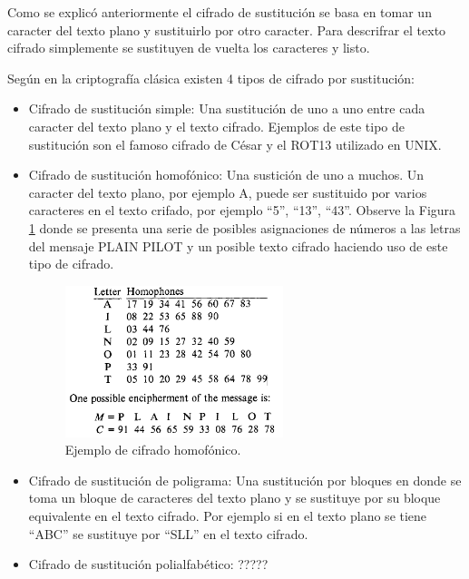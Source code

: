 Como se explicó anteriormente el cifrado de sustitución se basa en tomar un caracter del texto plano y sustituirlo por otro caracter. Para descrifrar el texto cifrado simplemente se sustituyen de vuelta los caracteres y listo.

Según \cite{bruce} en la criptografía clásica existen 4 tipos de cifrado por sustitución:
\begin{itemize}
\item Cifrado de sustitución simple: Una sustitución de uno a uno entre cada caracter del texto plano y el texto cifrado.
Ejemplos de este tipo de sustitución son el famoso cifrado de César y el ROT13 utilizado en UNIX.

\item Cifrado de sustitución homofónico: Una sustición de uno a muchos. Un caracter del texto plano, por ejemplo A, puede ser sustituido por varios caracteres en el texto crifado, por ejemplo ``5'', ``13'', ``43''. Observe la Figura \ref{figExampleHomophonicCipher} donde se presenta una serie de posibles asignaciones de números a las letras del mensaje PLAIN PILOT y un posible texto cifrado haciendo uso de este tipo de cifrado.

\begin{figure}
	\centering
	\includegraphics[width=0.6\textwidth]{./images/figExampleHomophonicCipher}
	\caption{Ejemplo de cifrado homofónico.}
	\label{figExampleHomophonicCipher}
\end{figure}


\item Cifrado de sustitución de poligrama: Una sustitución por bloques en donde se toma un bloque de caracteres del texto plano y se sustituye por su bloque equivalente en el texto cifrado. Por ejemplo si en el texto plano se tiene ``ABC'' se sustituye por ``SLL'' en el texto cifrado.

\item Cifrado de sustitución polialfabético: ????? 
\end{itemize}

